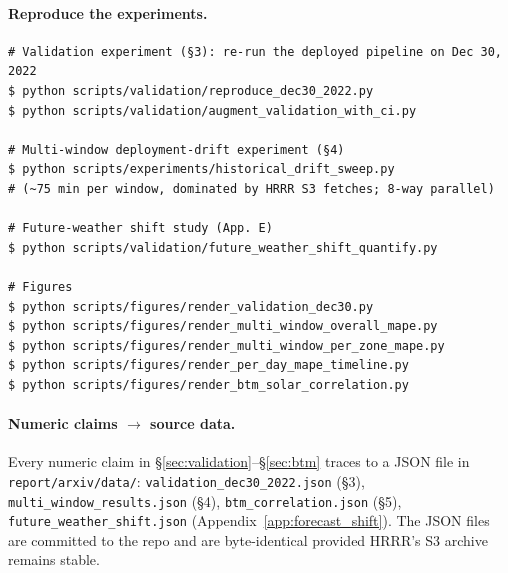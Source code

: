 \paragraph{Reproduce the experiments.}
\begin{lstlisting}[basicstyle=\ttfamily\footnotesize]
# Validation experiment (§3): re-run the deployed pipeline on Dec 30, 2022
$ python scripts/validation/reproduce_dec30_2022.py
$ python scripts/validation/augment_validation_with_ci.py

# Multi-window deployment-drift experiment (§4)
$ python scripts/experiments/historical_drift_sweep.py
# (~75 min per window, dominated by HRRR S3 fetches; 8-way parallel)

# Future-weather shift study (App. E)
$ python scripts/validation/future_weather_shift_quantify.py

# Figures
$ python scripts/figures/render_validation_dec30.py
$ python scripts/figures/render_multi_window_overall_mape.py
$ python scripts/figures/render_multi_window_per_zone_mape.py
$ python scripts/figures/render_per_day_mape_timeline.py
$ python scripts/figures/render_btm_solar_correlation.py
\end{lstlisting}

\paragraph{Numeric claims $\to$ source data.}
Every numeric claim in §\ref{sec:validation}--§\ref{sec:btm} traces to a
JSON file in \texttt{report/arxiv/data/}: \texttt{validation\_dec30\_2022.json}
(§3), \texttt{multi\_window\_results.json} (§4), \texttt{btm\_correlation.json}
(§5), \texttt{future\_weather\_shift.json} (Appendix~\ref{app:forecast_shift}).
The JSON files are committed to the repo and are byte-identical
provided HRRR's S3 archive remains stable.
